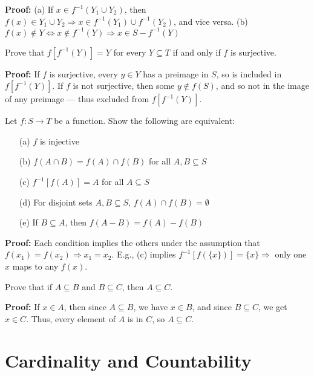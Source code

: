 \textbf{Proof:}  
(a) If \( x \in f^{-1}(Y_1 \cup Y_2) \), then \( f(x) \in Y_1 \cup Y_2 \Rightarrow x \in f^{-1}(Y_1) \cup f^{-1}(Y_2) \), and vice versa.  
(b) \( f(x) \notin Y \iff x \notin f^{-1}(Y) \Rightarrow x \in S - f^{-1}(Y) \)

\begin{problembox}
Prove that \( f[f^{-1}(Y)] = Y \) for every \( Y \subseteq T \) if and only if \( f \) is surjective.
\end{problembox}

\textbf{Proof:}  
If \( f \) is surjective, every \( y \in Y \) has a preimage in \( S \), so is included in \( f[f^{-1}(Y)] \).  
If \( f \) is not surjective, then some \( y \notin f(S) \), and so not in the image of any preimage — thus excluded from \( f[f^{-1}(Y)] \).

\begin{problembox}
Let \( f: S \to T \) be a function. Show the following are equivalent:
\begin{itemize}
\item[(a)] \( f \) is injective
\item[(b)] \( f(A \cap B) = f(A) \cap f(B) \) for all \( A, B \subseteq S \)
\item[(c)] \( f^{-1}[f(A)] = A \) for all \( A \subseteq S \)
\item[(d)] For disjoint sets \( A, B \subseteq S \), \( f(A) \cap f(B) = \emptyset \)
\item[(e)] If \( B \subseteq A \), then \( f(A - B) = f(A) - f(B) \)
\end{itemize}
\end{problembox}

\textbf{Proof:}  
Each condition implies the others under the assumption that \( f(x_1) = f(x_2) \Rightarrow x_1 = x_2 \).  
E.g., (c) implies \( f^{-1}[f(\{x\})] = \{x\} \Rightarrow \) only one \( x \) maps to any \( f(x) \).

\begin{problembox}
Prove that if \( A \subseteq B \) and \( B \subseteq C \), then \( A \subseteq C \).
\end{problembox}

\textbf{Proof:}  
If \( x \in A \), then since \( A \subseteq B \), we have \( x \in B \), and since \( B \subseteq C \), we get \( x \in C \).  
Thus, every element of \( A \) is in \( C \), so \( A \subseteq C \).

\section{Cardinality and Countability}

